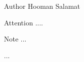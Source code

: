 \begin{DoxyAuthor}{Author}
Hooman Salamat
\end{DoxyAuthor}
\begin{DoxyAttention}{Attention}
....
\end{DoxyAttention}
\begin{DoxyNote}{Note}
...
\end{DoxyNote}
... 
